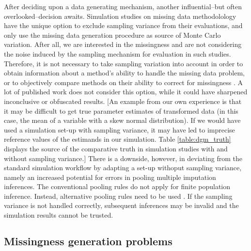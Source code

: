 \documentclass[bimj,fleqn]{w-art}
\begin{document}
After deciding upon a data generating mechanism, another influential--but often overlooked--decision awaits. Simulation studies on missing data methodolology have the unique option to exclude sampling variance from their evaluations, and only use the missing data generation procedure as source of Monte Carlo variation. After all, we are interested in the missingness and are not considering the noise induced by the sampling mechanism for evaluation in such studies. Therefore, it is not necessary to take sampling variation into account in order to obtain information about a method's ability to handle the missing data problem, or to objectively compare methods on their ability to correct for missingness \citep{vink14}. A lot of published work does not consider this option, while it could have sharpened inconclusive or obfuscated results. [An example from our own experience is that it may be difficult to get true parameter estimates of transformed data (in this case, the mean of a variable with a skew normal distribution). If we would have used a simulation set-up with sampling variance, it may have led to imprecise reference values of the estimands in our simulation. Table \ref{table:dgm_truth} displays the source of the comparative truth in simulation studies with and without sampling variance.] There is a downside, however, in deviating from the standard simulation workflow by adapting a set-up withoput sampling variance, namely an increased potential for errors in pooling multiple imputation inferences. The conventional pooling rules \citep[cf.][p. 76-77]{rubi87} do not apply for finite population inference. Instead, alternative pooling rules need to be used \citep{raghunathan2003multiple,vink14}. If the sampling variance is not handled correctly, subsequent inferences may be invalid and the simulation results cannot be trusted.



\subsection{Missingness generation problems}
\end{document}
